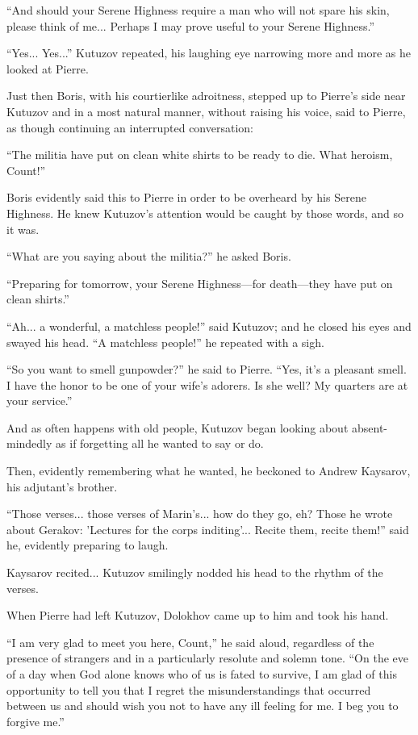 ``And should your Serene Highness require a man who will not
spare his skin, please think of me... Perhaps I may prove useful
to your Serene Highness.''

``Yes... Yes...'' Kutuzov repeated, his laughing eye narrowing
more and more as he looked at Pierre.

Just then Boris, with his courtierlike adroitness, stepped up to
Pierre's side near Kutuzov and in a most natural manner, without
raising his voice, said to Pierre, as though continuing an
interrupted conversation:

``The militia have put on clean white shirts to be ready to
die. What heroism, Count!''

Boris evidently said this to Pierre in order to be overheard by
his Serene Highness. He knew Kutuzov's attention would be caught
by those words, and so it was.

``What are you saying about the militia?'' he asked Boris.

``Preparing for tomorrow, your Serene Highness---for death---they
have put on clean shirts.''

``Ah... a wonderful, a matchless people!'' said Kutuzov; and he
closed his eyes and swayed his head. ``A matchless people!'' he
repeated with a sigh.

``So you want to smell gunpowder?'' he said to Pierre. ``Yes,
it's a pleasant smell. I have the honor to be one of your wife's
adorers. Is she well? My quarters are at your service.''

And as often happens with old people, Kutuzov began looking about
absent-mindedly as if forgetting all he wanted to say or do.

Then, evidently remembering what he wanted, he beckoned to Andrew
Kaysarov, his adjutant's brother.

``Those verses... those verses of Marin's... how do they go, eh?
Those he wrote about Gerakov: 'Lectures for the corps
inditing'... Recite them, recite them!'' said he, evidently
preparing to laugh.

Kaysarov recited... Kutuzov smilingly nodded his head to the
rhythm of the verses.

When Pierre had left Kutuzov, Dolokhov came up to him and took
his hand.

``I am very glad to meet you here, Count,'' he said aloud,
regardless of the presence of strangers and in a particularly
resolute and solemn tone. ``On the eve of a day when God alone
knows who of us is fated to survive, I am glad of this
opportunity to tell you that I regret the misunderstandings that
occurred between us and should wish you not to have any ill
feeling for me. I beg you to forgive me.''


